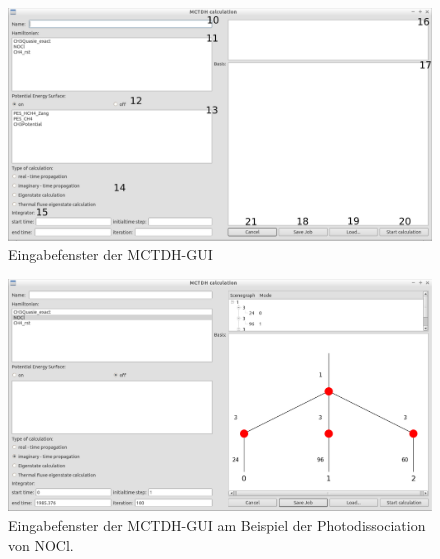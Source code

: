 \begin{figure}
    \centering
    \includegraphics[angle=90, scale=0.45]{figures/screenWidgetA}
    \caption{Eingabefenster der MCTDH-GUI}\label{fig:workflow4}
\end{figure}
\begin{figure}
    \centering
    \includegraphics[angle=90, scale=0.45]{figures/screenWidgetAexample}
    \caption{Eingabefenster der MCTDH-GUI am Beispiel der
    Photodissociation von NOCl.}\label{fig:workflow5}
\end{figure}